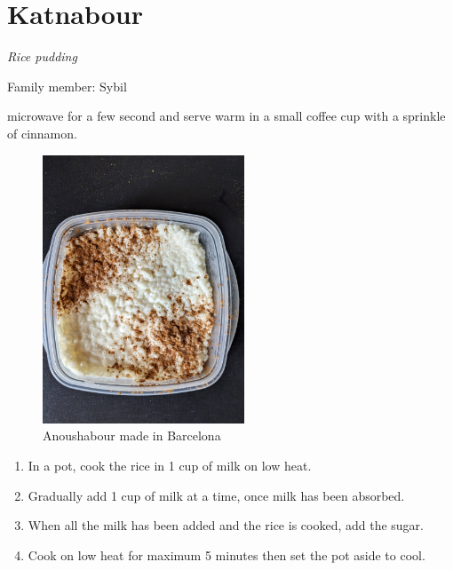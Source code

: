 \chapter{Katnabour}
\label{ch:katnabour}


\textit{Rice pudding}

Family member: Sybil

 microwave for a few second and serve warm in a small coffee cup with a sprinkle of cinnamon.

\begin{figure}
  \includegraphics[width=60mm]{dermardiros/images/Rice pudding.jpg}
  \caption{Anoushabour made in Barcelona}
\end{figure}


\begin{enumerate}
    \item In a pot, cook the rice in 1 cup of milk on low heat.
    \item Gradually add 1 cup of milk at a time, once milk has been absorbed.
    \item When all the milk has been added and the rice is cooked, add the sugar. 
    \item Cook on low heat for maximum 5 minutes then set the pot aside to cool.
\end{enumerate}
